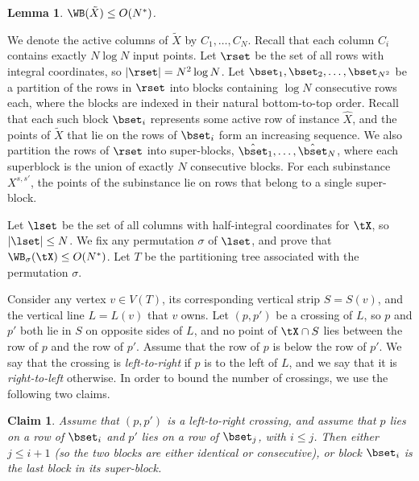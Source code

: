 \documentclass[11pt]{article}
\numberwithin{equation}{section}
\newtheorem{lemma}[theorem]{Lemma}
\newtheorem{claim}[theorem]{Claim}
\theoremstyle{definition}
\theoremstyle{plain}
\begin{document}
\begin{lemma}\label{lem: bounding vertical WB for compressed}
	 $\WB(\tilde X)\leq O(N^*)$.
\end{lemma}

We denote the active columns of $\tilde X$ by $C_1,\ldots,C_N$. 
Recall that each column $C_i$ contains exactly $N\log N$ input points. 
Let $\rset$ be the set of all rows with integral coordinates, so $|\rset|=N^2\log N$. Let $\bset_1,\bset_2,\ldots,\bset_{N^2}$ be a partition of the rows in $\rset$ into blocks containing $\log N$ consecutive rows each, where the blocks are indexed in their natural bottom-to-top order. Recall that each such block $\bset_i$ represents some active row of instance $\hat X$, and the points of $\tilde X$ that lie on the rows of $\bset_i$ form an increasing sequence. We also partition the rows of $\rset$ into super-blocks, $\hat \bset_1,\ldots,\hat \bset_N$, where each superblock is the union of exactly $N$ consecutive blocks. For each subinstance $X^{s,s'}$, the points of the subinstance lie on rows that belong to a single super-block.


Let $\lset$ be the set of all columns with half-integral coordinates for $\tX$, so $|\lset|\leq N$. We fix any permutation $\sigma$ of $\lset$, and prove that $\WB_{\sigma}(\tX)\leq O(N^*)$. Let $T$ be the partitioning tree associated with the permutation $\sigma$.

Consider any vertex $v\in V(T)$, its corresponding vertical strip $S=S(v)$, and the vertical line $L= L(v)$ that $v$ owns. 
Let $(p,p')$ be a crossing of $L$, so $p$ and $p'$ both lie in $S$ on opposite sides of $L$, and no point of $\tX\cap S$ lies between the row of $p$ and the row of $p'$. Assume that the row of $p$ is below the row of $p'$. We say that the crossing is \emph{left-to-right} if $p$ is to the left of $L$, and we say that it is \emph{right-to-left} otherwise. In order to bound the number of crossings, we use the following two claims.

\begin{claim}\label{claim: left to right crossing}
	Assume that $(p,p')$ is a left-to-right crossing, and assume that $p$ lies on a row of $\bset_i$ and $p'$ lies on a row of $\bset_j$, with $i\leq j$. Then either $j\leq i+1$ (so the two blocks are either identical or consecutive), or block $\bset_i$ is the last block in its super-block.
\end{claim}
\end{document}
